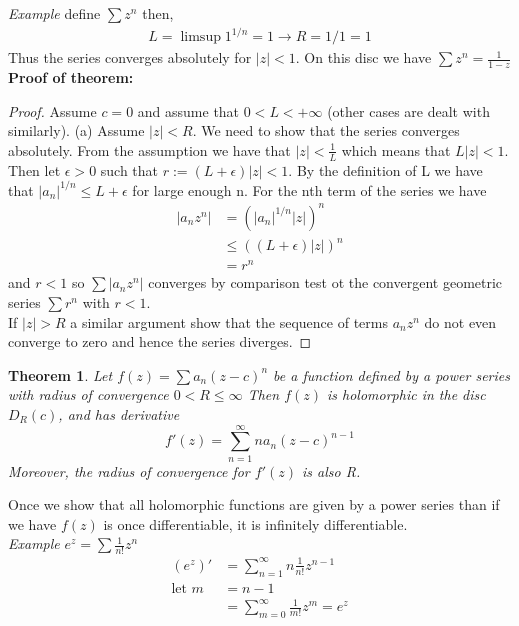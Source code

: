 \documentclass[a4paper, 11pt]{article}
\newtheorem*{theorem}{Theorem}
\begin{document}
	\noindent\textit{Example} define $\sum z^n$ then, 
		\begin{align*}
			L = \limsup 1^{1/n} = 1 \rightarrow R = 1/1 = 1
		\end{align*}
	\noindent Thus 
	the series converges absolutely for $|z|<1$. On this disc we have $\sum z^n = \frac{1}{1-z}$\\
	
	\noindent\textbf{Proof of theorem:} 
	\begin{proof}
		Assume $c=0$ and assume that $0<L<+\infty$ (other cases are dealt with similarly). (a) Assume $|z|<R$. We need to show that the series converges absolutely. From the assumption we have that $|z| < \frac{1}{L}$ which means that $L|z|<1$. Then let $\epsilon > 0$ such that $r:=(L+\epsilon)|z|<1$. By the definition of L we have that $|a_n|^{1/n} \leq L+\epsilon$ for large enough n. For the nth term of the series we have 
		\begin{align*}
			|a_n z^n| &= (|a_n|^{1/n}|z|)^n \\ 
				&\leq ((L+\epsilon)|z|)^n \\ 
				&= r^n 
		\end{align*}
		and $r<1$ so $\sum |a_nz^n|$ converges by comparison test ot the convergent geometric series $\sum r^n$ with $r<1$. \\ 
		
		\noindent If $|z|>R$ a similar argument show that the sequence of terms $a_nz^n$ do not even converge to zero and hence the series diverges. 
	\end{proof}
	

	\begin{theorem}
		Let $f(z) = \sum a_n (z-c)^n$ be a function defined by a power series with radius of convergence $0<R\leq\infty$ Then $f(z)$ is holomorphic in the disc $D_R(c)$, and has derivative	
			\begin{equation*}
				f'(z) = \sum\limits_{n=1}^\infty na_n(z-c)^{n-1}
			\end{equation*}
		\noindent Moreover, the radius of convergence for $f'(z)$ is also R. 
	\end{theorem}
	
	Once we show that all holomorphic functions are given by a power series than if we have $f(z)$ is once differentiable, it is infinitely differentiable. \\
	
	\textit{Example} $e^z = \sum \frac{1}{n!}z^n$ 
		\begin{align*}
			(e^z)' &= \sum_{n=1}^\infty n\frac{1}{n!}z^{n-1} \\ 
			\text{let } m &= n-1 \\ 
			 &= \sum_{m=0}^\infty \frac{1}{m!}z^m = e^z
		\end{align*}
	
\end{document}
